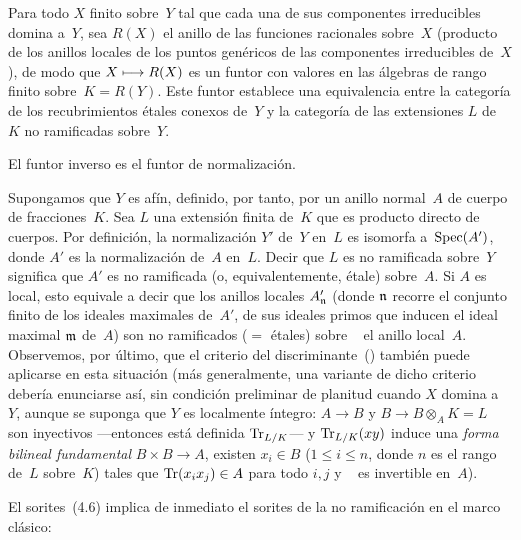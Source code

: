 \begin{corollaire}
\label{I.10.3}
Para todo $X$ finito sobre~$Y$ tal que cada una de sus componentes irreducibles domina a~$Y$, sea $R(X)$ el anillo de las funciones racionales sobre~$X$ (producto de los anillos
locales de los puntos genéricos de las componentes irreducibles de~$X$), de modo que $X\longmapsto R(X)$ es un funtor con valores en las álgebras de rango finito sobre~$K=R(Y)$. Este funtor establece una equivalencia entre la categoría de los recubrimientos étales conexos de~$Y$ y la categoría de las extensiones $L$ de~$K$ no ramificadas sobre~$Y$.
\end{corollaire}

El funtor inverso es el funtor de normalización.

Supongamos que $Y$ es afín, definido, por tanto, por un anillo normal~$A$ de cuerpo de fracciones~$K$. Sea $L$ una extensión finita de~$K$ que es producto directo de cuerpos. Por definición, la normalización $Y'$ de~$Y$ en~$L$ es isomorfa a~$\operatorname{Spec}(A')$, donde $A'$ es la normalización de~$A$ en~$L$. Decir que $L$ es no ramificada sobre~$Y$ significa que $A'$ es no ramificada (o, equivalentemente, étale) sobre~$A$. Si $A$ es local, esto equivale a decir que los anillos locales $A'_{\mathfrak{n}}$ (donde $\mathfrak{n}$ recorre el conjunto finito de los ideales maximales de~$A'$, \ie de sus ideales primos que inducen el ideal maximal $\mathfrak{m}$ de~$A$) son no ramificados ($=$ étales) sobre
\ %
el anillo local~$A$. Observemos, por último, que el criterio del discriminante~() también puede aplicarse en esta situación (más generalmente, una variante de dicho criterio debería enunciarse así, sin condición preliminar de planitud cuando $X$ domina a~$Y$, aunque se suponga que $Y$ es localmente íntegro: $A\to B$ y $B\to B\otimes_AK=L$ son inyectivos ---entonces está definida $\operatorname{Tr}_{L/K}$--- y $\operatorname{Tr}_{L/K}(xy)$ induce una \emph{forma bilineal fundamental} $B\times B\to A$, \ie existen $x_i\in B$ ($1\leq i\leq n$, donde $n$ es el rango de~$L$ sobre~$K$) tales que $\operatorname{Tr}(x_ix_j)\in A$ para todo $i,j$ y
\ %
es invertible en~$A$).

El sorites~(4.6) implica de inmediato el sorites de la no ramificación en el marco clásico:

